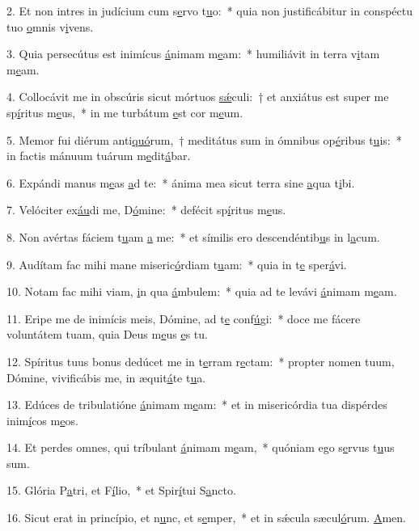 2. Et non intres in judícium cum s\uline{e}rvo t\uline{u}o:~* quia non justificábitur in conspéctu tuo \uline{o}mnis v\uline{i}vens.\par 
3. Quia persecútus est inimícus \uline{á}nimam m\uline{e}am:~* humiliávit in terra v\uline{i}tam m\uline{e}am.\par 
4. Collocávit me in obscúris sicut mórtuos \uline{sǽ}culi:~† et anxiátus est super me sp\uline{í}ritus m\uline{e}us,~* in me turbátum \uline{e}st cor m\uline{e}um.\par 
5. Memor fui diérum anti\uline{quó}rum,~† meditátus sum in ómnibus op\uline{é}ribus t\uline{u}is:~* in factis mánuum tuárum m\uline{e}dit\uline{á}bar.\par 
6. Expándi manus m\uline{e}as \uline{a}d te:~* ánima mea sicut terra sine \uline{a}qua t\uline{i}bi.\par 
7. Velóciter ex\uline{áu}di me, D\uline{ó}mine:~* defécit sp\uline{í}ritus m\uline{e}us.\par 
8. Non avértas fáciem t\uline{u}am \uline{a} me:~* et símilis ero descendéntib\uline{u}s in l\uline{a}cum.\par 
9. Audítam fac mihi mane miseric\uline{ó}rdiam t\uline{u}am:~* quia in t\uline{e} sper\uline{á}vi.\par 
10. Notam fac mihi viam, \uline{i}n qua \uline{á}mbulem:~* quia ad te levávi \uline{á}nimam m\uline{e}am.\par 
11. Eripe me de inimícis meis, Dómine, ad t\uline{e} conf\uline{ú}gi:~* doce me fácere voluntátem tuam, quia Deus m\uline{e}us \uline{e}s tu.\par 
12. Spíritus tuus bonus dedúcet me in t\uline{e}rram r\uline{e}ctam:~* propter nomen tuum, Dómine, vivificábis me, in æquit\uline{á}te t\uline{u}a.\par 
13. Edúces de tribulatióne \uline{á}nimam m\uline{e}am:~* et in misericórdia tua dispérdes inim\uline{í}cos m\uline{e}os.\par 
14. Et perdes omnes, qui tríbulant \uline{á}nimam m\uline{e}am,~* quóniam ego s\uline{e}rvus t\uline{u}us sum.\par 
15. Glória P\uline{a}tri, et F\uline{í}lio,~* et Spir\uline{í}tui S\uline{a}ncto.\par 
16. Sicut erat in princípio, et n\uline{u}nc, et s\uline{e}mper,~* et in sǽcula sæcul\uline{ó}rum. \uline{A}men.\par 
